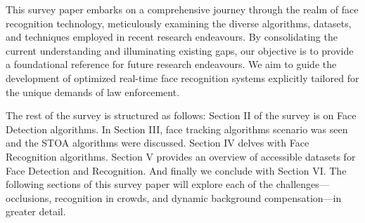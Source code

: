 This survey paper embarks on a comprehensive journey through the realm of face recognition technology, meticulously examining the diverse algorithms, datasets, and techniques employed in recent research endeavours. By consolidating the current understanding and illuminating existing gaps, our objective is to provide a foundational reference for future research endeavours. We aim to guide the development of optimized real-time face recognition systems explicitly tailored for the unique demands of law enforcement. 

The rest of the survey is structured as follows: Section II of the survey is on Face Detection algorithms. In Section III, face tracking algorithms scenario was seen and the STOA algorithms were discussed. Section IV delves with Face Recognition algorithms. Section V provides an overview of accessible datasets for Face Detection and Recognition. And finally we conclude with Section VI. The following sections of this survey paper will explore each of the challenges—occlusions, recognition in crowds, and dynamic background compensation—in greater detail. 